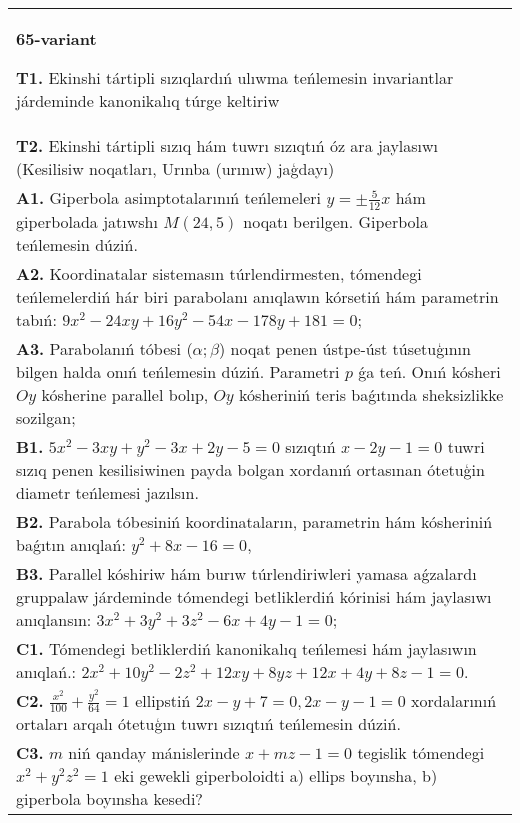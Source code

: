 \documentclass{article}
\begin{document}
\begin{tabular}{m{17cm}}
\textbf{65-variant}
\newline

\textbf{T1.} Ekinshi tártipli sızıqlardıń ulıwma teńlemesin invariantlar járdeminde kanonikalıq túrge keltiriw \\
\textbf{T2.} Ekinshi tártipli sızıq hám tuwrı sızıqtıń óz ara jaylasıwı (Kesilisiw noqatları, Urınba (urınıw) jaģdayı) \\
\textbf{A1.} Giperbola asimptotalarınıń teńlemeleri $y= \pm \frac{5}{12} x$ hám giperbolada jatıwshı $M (24,5) $ noqatı berilgen. Giperbola teńlemesin dúziń. \\
\textbf{A2.} Koordinatalar sistemasın túrlendirmesten, tómendegi teńlemelerdiń hár biri parabolanı anıqlawın kórsetiń hám parametrin tabıń: $9 x^2-24 x y+16 y^2-54 x-178 y+181=0$; \\
\textbf{A3.} Parabolanıń tóbesi ($\alpha;\beta$) noqat penen ústpe-úst túsetuģının bilgen halda onıń teńlemesin dúziń. Parametri $p$ ǵa teń. Onıń kósheri $O y$ kósherine parallel bolıp, $O y$ kósheriniń teris baǵıtında sheksizlikke sozilgan; \\
\textbf{B1.} $5 x^2-3 x y+y^2-3 x+2 y-5=0$ sızıqtıń $x-2 y-1=0$ tuwri sızıq penen kesilisiwinen payda bolgan xordanıń ortasınan ótetuģin diametr teńlemesi jazılsın. \\
\textbf{B2.} Parabola tóbesiniń koordinataların, parametrin hám kósheriniń baǵıtın anıqlań: $y^2+8 x-16=0$, \\
\textbf{B3.} Parallel kóshiriw hám burıw túrlendiriwleri yamasa aǵzalardı gruppalaw járdeminde tómendegi betliklerdiń kórinisi hám jaylasıwı anıqlansın: $3 x^2+3 y^2+3 z^2-6 x+4 y-1=0$; \\
\textbf{C1.} Tómendegi betliklerdiń kanonikalıq teńlemesi hám jaylasıwın anıqlań.: $2 x^2+10 y^2-2 z^2+12 x y+8 y z+12 x+4 y+8 z-1=0$. \\
\textbf{C2.} $\frac{x^2}{100}+\frac{y^2}{64}=1$ ellipstiń $2 x-y+7=0,2 x-y-1=0$ xordalarınıń ortaları arqalı ótetuģın tuwrı sızıqtıń teńlemesin dúziń. \\
\textbf{C3.} $m$ niń qanday mánislerinde $x+mz-1=0$ tegislik tómendegi $x^2+y^2z^2=1$ eki gewekli giperboloidti a) ellips boyınsha, b) giperbola boyınsha kesedi? \\

\end{tabular}
\vspace{1cm}
\end{document}
